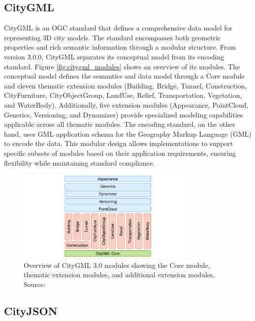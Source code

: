 \subsection{CityGML}
\label{rw:citygml}
CityGML is an OGC standard \citep{CityGML} that defines a comprehensive data model for representing 3D city models. The standard encompasses both geometric properties and rich semantic information through a modular structure. From version 3.0.0, CityGML separates its conceptual model from its encoding standard. Figure \autoref{fig:citygml_modules} shows an overview of its modules. The conceptual model defines the semantics and data model through a Core module and eleven thematic extension modules (Building, Bridge, Tunnel, Construction, CityFurniture, CityObjectGroup, LandUse, Relief, Transportation, Vegetation, and WaterBody). Additionally, five extension modules (Appearance, PointCloud, Generics, Versioning, and Dynamizer) provide specialized modeling capabilities applicable across all thematic modules. The encoding standard, on the other hand, uses GML application schema for the Geography Markup Language (GML) \citep{gml} to encode the data. This modular design allows implementations to support specific subsets of modules based on their application requirements, ensuring flexibility while maintaining standard compliance.

\begin{figure}[htbp]
  \centering
  \includegraphics[width=0.8\textwidth]{figs/related_work_theoretical_bg/citygml3modules.png}
  \caption[CityGML 3.0 Module Overview]{Overview of CityGML 3.0 modules showing the Core module, thematic extension modules, and additional extension modules. Source: \citep{CityGML}}
  \label{fig:citygml_modules}
\end{figure}

\subsection{CityJSON}
\label{rw:cityjson}

